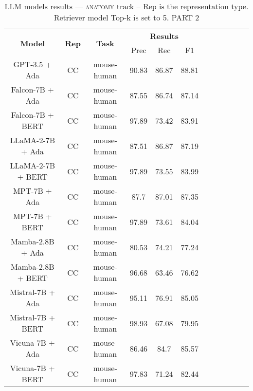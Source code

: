 \begin{table}
        \centering
        \small
        \caption{LLM models results --- \textsc{anatomy} track -- Rep is the representation type. Retriever model Top-k is set to 5. PART 2 } \label{tab:llm_anatomy2}
        \begin{tabular}{|c|c|c|c|c|c|c|c|c|c|c|c|}
            \hline
             \multirow{2}{*}{\textbf{Model}}  & \multirow{2}{*}{\textbf{Rep}}  & \multirow{2}{*}{\textbf{Task}} &  \multicolumn{3}{c|}{\textbf{Results}} \\
             \cline{4-6}
              & & & Prec & Rec & F1  \\
            \hline
	GPT-3.5 + Ada  & CC & mouse-human  &  90.83 &  86.87 & 88.81  \\
	Falcon-7B + Ada  & CC & mouse-human  &  87.55 &  86.74 & 87.14  \\
	Falcon-7B + BERT  & CC & mouse-human  &  97.89 &  73.42 & 83.91  \\
	LLaMA-2-7B + Ada  & CC & mouse-human  &  87.51 &  86.87 & 87.19  \\
	LLaMA-2-7B + BERT  & CC & mouse-human  &  97.89 &  73.55 & 83.99  \\
	MPT-7B + Ada  & CC & mouse-human  &  87.7 &  87.01 & 87.35  \\
	MPT-7B + BERT  & CC & mouse-human  &  97.89 &  73.61 & 84.04  \\
	Mamba-2.8B + Ada  & CC & mouse-human  &  80.53 &  74.21 & 77.24  \\
	Mamba-2.8B + BERT  & CC & mouse-human  &  96.68 &  63.46 & 76.62  \\
	Mistral-7B + Ada  & CC & mouse-human  &  95.11 &  76.91 & 85.05  \\
	Mistral-7B + BERT  & CC & mouse-human  &  98.93 &  67.08 & 79.95  \\
	Vicuna-7B + Ada  & CC & mouse-human  &  86.46 &  84.7 & 85.57  \\
	Vicuna-7B + BERT  & CC & mouse-human  &  97.83 &  71.24 & 82.44  \\
	\hline
\end{tabular}
    \end{table}








